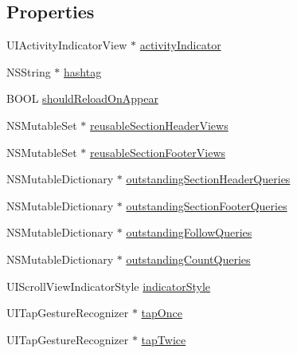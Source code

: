 \subsection*{Properties}
\begin{DoxyCompactItemize}
\item 
U\+I\+Activity\+Indicator\+View $\ast$ \hyperlink{interface_e_s_hashtag_timeline_view_controller_aced7c454628857add4d7c9c97bbac67b}{activity\+Indicator}
\item 
N\+S\+String $\ast$ \hyperlink{interface_e_s_hashtag_timeline_view_controller_a526473d45d170d65750dbec737d0c61f}{hashtag}
\item 
B\+O\+O\+L \hyperlink{interface_e_s_hashtag_timeline_view_controller_a333a85f25e01ad6f02cbbe55cb4f7306}{should\+Reload\+On\+Appear}
\item 
N\+S\+Mutable\+Set $\ast$ \hyperlink{interface_e_s_hashtag_timeline_view_controller_a3eb23c1c1b559cc4c0b4748d5cb7f39a}{reusable\+Section\+Header\+Views}
\item 
N\+S\+Mutable\+Set $\ast$ \hyperlink{interface_e_s_hashtag_timeline_view_controller_a9a6a60d1ffb5696a75ebbcef30616e22}{reusable\+Section\+Footer\+Views}
\item 
N\+S\+Mutable\+Dictionary $\ast$ \hyperlink{interface_e_s_hashtag_timeline_view_controller_a4f049cc10d2c7331c0f1ebf5724090e7}{outstanding\+Section\+Header\+Queries}
\item 
N\+S\+Mutable\+Dictionary $\ast$ \hyperlink{interface_e_s_hashtag_timeline_view_controller_a4b8dcc7d83bf43cd3675b21ae2333462}{outstanding\+Section\+Footer\+Queries}
\item 
N\+S\+Mutable\+Dictionary $\ast$ \hyperlink{interface_e_s_hashtag_timeline_view_controller_a0a7a2d8f4aa9d06eae128686918b736d}{outstanding\+Follow\+Queries}
\item 
N\+S\+Mutable\+Dictionary $\ast$ \hyperlink{interface_e_s_hashtag_timeline_view_controller_ae774febe26b7b8af82be9bdbcce51a39}{outstanding\+Count\+Queries}
\item 
U\+I\+Scroll\+View\+Indicator\+Style \hyperlink{interface_e_s_hashtag_timeline_view_controller_add20a2ab6ae4d9008b524f01469a5098}{indicator\+Style}
\item 
U\+I\+Tap\+Gesture\+Recognizer $\ast$ \hyperlink{interface_e_s_hashtag_timeline_view_controller_a02a4ae30a70eeeab88dd6632bc31d2a7}{tap\+Once}
\item 
U\+I\+Tap\+Gesture\+Recognizer $\ast$ \hyperlink{interface_e_s_hashtag_timeline_view_controller_a343813298deb75f763cde6a9a907c212}{tap\+Twice}
\end{DoxyCompactItemize}


